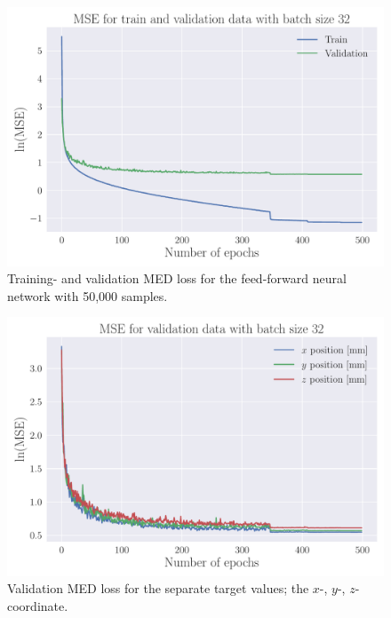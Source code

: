\documentclass[a4paper, UKenglish, 11pt]{uiomaster}
\begin{document}
\begin{figure}[!htb]
    \centering
    \includegraphics[width=\linewidth]{figures/mse_simple_32_0.001_0.35_0.5_0.0_500_(0).pdf}
    \caption{Training- and validation MED loss for the feed-forward neural network with 50,000 samples.}
    \label{fig:single_dipole_accuracy}
\end{figure}

\begin{figure}[!htb]
    \centering
    \includegraphics[width=\linewidth]{figures/mse_targets_simple_32_0.001_0.35_0.5_0.0_500_(0).pdf}
    \caption{Validation MED loss for the separate target values; the $x$-, $y$-, $z$-coordinate.}
    \label{fig:single_dipole_accuracy_targets}
\end{figure}
\end{document}
